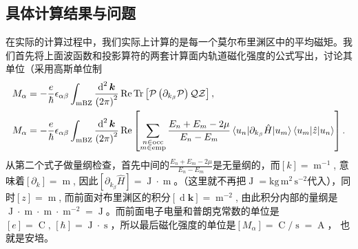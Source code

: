 \documentclass[10pt, oneside]{article}
\begin{document}
\subsection{具体计算结果与问题}
在实际的计算过程中，我们实际上计算的是每一个莫尔布里渊区中的平均磁矩。我们首先将上面波函数和投影算符的两套计算面内轨道磁化强度的公式写出，讨论其单位（采用高斯单位制
\begin{align}
	M_{\alpha} &= - \frac{e}{\hbar} \epsilon_{\alpha \beta} \int_{\mathrm{mBZ}} \frac{\operatorname{d}^{2} \bm{k}}{\left(2\pi\right)^2} \operatorname{Re} \operatorname{Tr} \left[\mathcal{P} \left(\partial_{k_{\beta}} \mathcal{P}\right) \mathcal{Q} \mathcal{Z}\right] ,\\
	M_{\alpha} &= - \frac{e }{\hbar} \epsilon_{\alpha \beta} \int_{\mathrm{mBZ}} \frac{\operatorname{d}^{2} \bm{k}}{\left(2\pi\right)^2} \operatorname{Re} \left[\sum_{\substack{n \in \mathrm{occ} \\ m \in \mathrm{emp}}} \frac{E_{n} + E_{m } - 2 \mu }{E_n - E_{m}} \braket{u_{n }| \partial_{k_{\beta}} \hat{H } | u_{m }} \braket{u_{m } | \hat{z} | u_{n }} \right].
\end{align}
从第二个式子做量纲检查，首先中间的\(\frac{E_{n} + E_{m } - 2 \mu }{E_n - E_{m}}\)是无量纲的，而\(\left[k \right] = \operatorname{m}^{-1}\), 意味着\(\left[\partial_{k }\right] = \operatorname{m}\), 因此\(\left[\partial_{k_{\beta}} \hat{H}\right] = \operatorname{J } \cdot \operatorname{m} \)。（这里就不再把\(\operatorname{J} = \operatorname{kg \, m^2 \, s^{-2}}\)代入），同时\(\left[z\right] = \operatorname{m }\), 而前面对布里渊区的积分\(\left[\operatorname{d} \bm{k}\right] = \operatorname{m}^{-2} \), 由此积分内部的量纲是\(\operatorname{J} \cdot \operatorname{m } \cdot \operatorname{m } \cdot \operatorname{m }^{-2} = \operatorname{J }\)。而前面电子电量和普朗克常数的单位是\(\left[e \right] = \operatorname{C}, \, \left[\hbar\right] = \operatorname{J} \cdot \operatorname{s}\)，所以最后磁化强度的单位是\(\left[M_{\alpha}\right] = \operatorname{C}/\operatorname{s}  = \operatorname{A}\)， 也就是安培。
\end{document}
